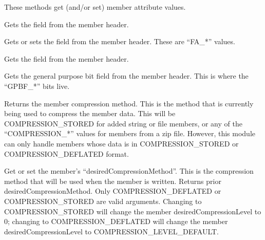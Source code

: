 \documentclass[]{article}
\renewcommand{\emph}[1]{\underline{#1}}
\begin{document}

These methods get (and/or set) member attribute values.

\begin{description}
\itemsep1pt\parskip0pt
\item[\emph{versionMadeBy()}]
Gets the field from the member header.
\end{description}

\begin{description}
\itemsep1pt\parskip0pt
\item[fileAttributeFormat( {[}\$format{]} )]
Gets or sets the field from the member header. These are ``FA\_*''
values.
\end{description}

\begin{description}
\itemsep1pt\parskip0pt
\item[\emph{versionNeededToExtract()}]
Gets the field from the member header.
\end{description}

\begin{description}
\itemsep1pt\parskip0pt
\item[\emph{bitFlag()}]
Gets the general purpose bit field from the member header. This is where
the ``GPBF\_*'' bits live.
\end{description}

\begin{description}
\itemsep1pt\parskip0pt
\item[\emph{compressionMethod()}]
Returns the member compression method. This is the method that is
currently being used to compress the member data. This will be
COMPRESSION\_STORED for added string or file members, or any of the
``COMPRESSION\_*'' values for members from a zip file. However, this
module can only handle members whose data is in COMPRESSION\_STORED or
COMPRESSION\_DEFLATED format.
\end{description}

\begin{description}
\itemsep1pt\parskip0pt
\item[desiredCompressionMethod( {[}\$method{]} )]
Get or set the member's ``desiredCompressionMethod''. This is the
compression method that will be used when the member is written. Returns
prior desiredCompressionMethod. Only COMPRESSION\_DEFLATED or
COMPRESSION\_STORED are valid arguments. Changing to COMPRESSION\_STORED
will change the member desiredCompressionLevel to 0; changing to
COMPRESSION\_DEFLATED will change the member desiredCompressionLevel to
COMPRESSION\_LEVEL\_DEFAULT.
\end{description}
\end{document}
